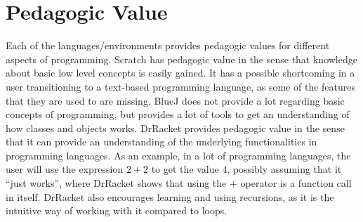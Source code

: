 \section{Pedagogic Value}
\label{sec:pedagogic_value}
Each of the languages/environments provides pedagogic values for different aspects of programming. Scratch has pedagogic value in the sense that knowledge about basic low level concepts is easily gained. It has a possible shortcoming in a user transitioning to a text-based programming language, as some of the features that they are used to are missing. BlueJ does not provide a lot regarding basic concepts of programming, but provides a lot of tools to get an understanding of how classes and objects works. DrRacket provides pedagogic value in the sense that it can provide an understanding of the underlying functionalities in programming languages. As an example, in a lot of programming languages, the user will use the expression $2+2$ to get the value $4$, possibly assuming that it ``just works'', where DrRacket shows that using the $+$ operator is a function call in itself. DrRacket also encourages learning and using recursions, as it is the intuitive way of working with it compared to loops. 